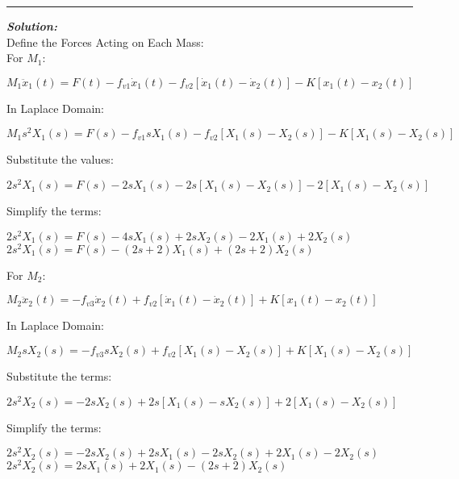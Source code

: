 \documentclass[11pt,letterpaper]{article}
\begin{document}
\rule{\textwidth}{1pt}
\vspace{12pt}
\textit{\textbf{Solution:}}\\
Define the Forces Acting on Each Mass:\\[12pt]
For $M_1$:\\[12pt]
\begin{center}
	$M_1\ddot{x}_1(t)=F(t)-f_{v1}\dot{x}_1(t)-f_{v2}[\dot{x}_1(t)-\dot{x}_2(t)]-K[x_1(t)-x_2(t)]$\\
\end{center}
In Laplace Domain:\\
\begin{center}
	$M_1s^2X_1(s)=F(s)-f_{v1}sX_1(s)-f_{v2}[X_1(s)-X_2(s)]-K[X_1(s)-X_2(s)]$\\
\end{center}
Substitute the values:\\
\begin{center}
	$2s^2X_1(s)=F(s)-2sX_1(s)-2s[X_1(s)-X_2(s)]-2[X_1(s)-X_2(s)]$\\
\end{center}
Simplify the terms:\\
\begin{center}
	$2s^2X_1(s)=F(s)-4sX_1(s)+2sX_2(s)-2X_1(s)+2X_2(s)$\\[12pt]
	$2s^2X_1(s)=F(s)-(2s+2)X_1(s)+(2s+2)X_2(s)$\\[12pt]
\end{center}
For $M_2$:\\[12pt]
\begin{center}
	$M_2\ddot{x}_2(t)=-f_{v3}\dot{x}_2(t)+f_{v2}[\dot{x}_1(t)-\dot{x}_2(t)]+K[x_1(t)-x_2(t)]$\\
\end{center}
In Laplace Domain:\\
\begin{center}
	$M_2sX_2(s)=-f_{v3}sX_2(s)+f_{v2}[X_1(s)-X_2(s)]+K[X_1(s)-X_2(s)]$\\
\end{center}
Substitute the terms:\\
\begin{center}
	$2s^2X_2(s)=-2sX_2(s)+2s[X_1(s)-sX_2(s)]+2[X_1(s)-X_2(s)]$\\
\end{center}
Simplify the terms:\\
\begin{center}
	$2s^2X_2(s)=-2sX_2(s)+2sX_1(s)-2sX_2(s)+2X_1(s)-2X_2(s)$\\[12pt]
	$2s^2X_2(s)=2sX_1(s)+2X_1(s)-(2s+2)X_2(s)$\\[12pt]
\end{center}
\end{document}
